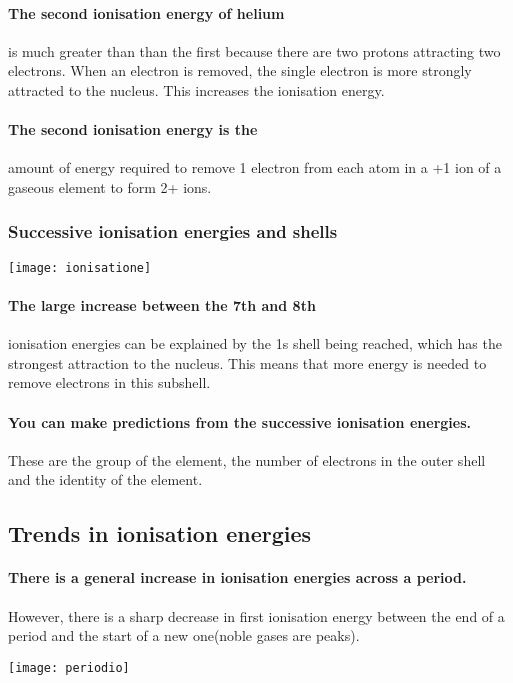  \paragraph{The second ionisation energy of helium} is much greater than than the first because there are two protons attracting two electrons. When an electron is removed, the single electron is more strongly attracted to the nucleus. This increases the ionisation energy.
 \paragraph{The second ionisation energy is the}amount of energy required to remove 1 electron from each atom in a +1 ion of a gaseous element to form 2+ ions.
 \subsubsection{Successive ionisation energies and shells}
 \begin{center}
\texttt{[image: ionisatione]}
\end{center}
\paragraph{The large increase between the 7th and 8th}ionisation energies can be explained by the 1s shell being reached, which has the strongest attraction to the nucleus. This means that more energy is needed to remove electrons in this subshell.
\paragraph{You can make predictions from the successive ionisation energies.} These are the group of the element, the number of electrons in the outer shell and the identity of the element.
\subsection{Trends in ionisation energies}
\paragraph{There is a general increase in ionisation energies across a period.}However, there is a sharp decrease in first ionisation energy between the end of a period and the start of a new one(noble gases are peaks).
\begin{center}
\texttt{[image: periodio]}
\end{center}
